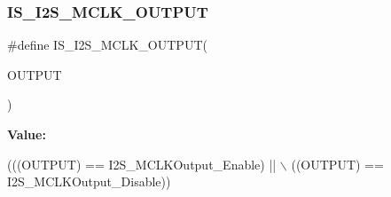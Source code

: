 \subsubsection{\texorpdfstring{I\+S\+\_\+\+I2\+S\+\_\+\+M\+C\+L\+K\+\_\+\+O\+U\+T\+P\+UT}{IS\_I2S\_MCLK\_OUTPUT}}
{\footnotesize\ttfamily \#define I\+S\+\_\+\+I2\+S\+\_\+\+M\+C\+L\+K\+\_\+\+O\+U\+T\+P\+UT(\begin{DoxyParamCaption}\item[{}]{O\+U\+T\+P\+UT }\end{DoxyParamCaption})}

{\bfseries Value\+:}
\begin{DoxyCode}
(((OUTPUT) == I2S\_MCLKOutput\_Enable) || \(\backslash\)
                                    ((OUTPUT) == I2S\_MCLKOutput\_Disable))
\end{DoxyCode}
